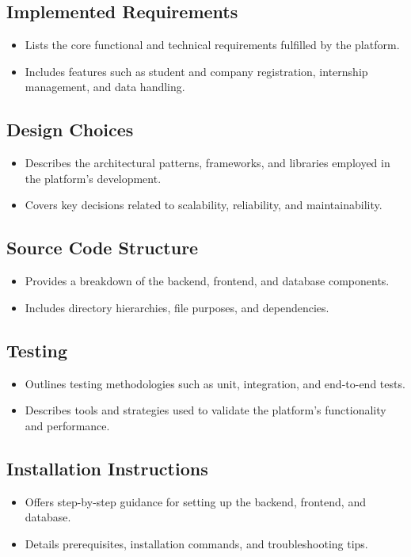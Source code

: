 \subsection*{Implemented Requirements}
\begin{itemize}
    \item Lists the core functional and technical requirements fulfilled by the platform.
    \item Includes features such as student and company registration, internship management, and data handling.
\end{itemize}

\subsection*{Design Choices}
\begin{itemize}
    \item Describes the architectural patterns, frameworks, and libraries employed in the platform's development.
    \item Covers key decisions related to scalability, reliability, and maintainability.
\end{itemize}

\subsection*{Source Code Structure}
\begin{itemize}
    \item Provides a breakdown of the backend, frontend, and database components.
    \item Includes directory hierarchies, file purposes, and dependencies.
\end{itemize}

\subsection*{Testing}
\begin{itemize}
    \item Outlines testing methodologies such as unit, integration, and end-to-end tests.
    \item Describes tools and strategies used to validate the platform's functionality and performance.
\end{itemize}

\subsection*{Installation Instructions}
\begin{itemize}
    \item Offers step-by-step guidance for setting up the backend, frontend, and database.
    \item Details prerequisites, installation commands, and troubleshooting tips.
\end{itemize}

